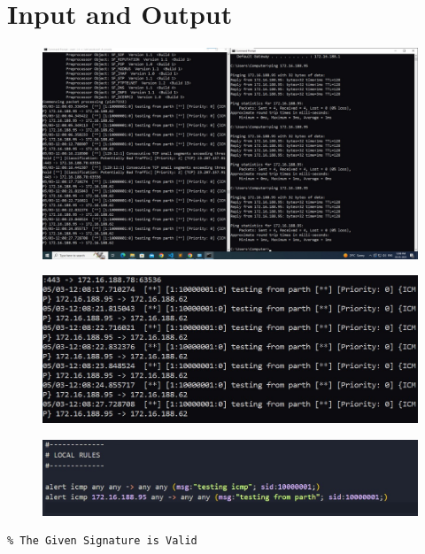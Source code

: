 \documentclass[11pt]{article}
\begin{document}
\section{Input and Output}
\begin{figure}[H]
    \centering
    \includegraphics[width=.95\textwidth]{snort1.jpeg}
    \caption{}
\end{figure}
\begin{figure}[H]
    \centering
    \includegraphics[width=.95\textwidth]{snort2.jpeg}
    \caption{}
\end{figure}
\begin{figure}[H]
    \centering
    \includegraphics[width=.95\textwidth]{snort3.jpeg}
    \caption{}
\end{figure}
\begin{verbatim}
% The Given Signature is Valid
\end{verbatim}

% 
\end{document}
